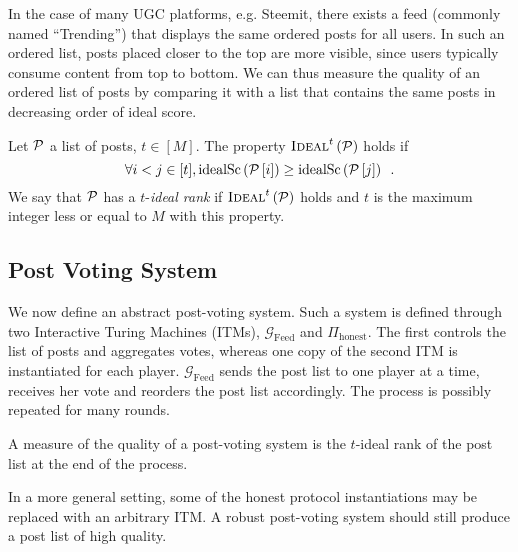 \documentclass[a4paper,english,cleveref, autoref]{oasics-v2019}
\begin{document}
    \noindent In the case of many UGC platforms, e.g. Steemit, there exists a
    feed (commonly named ``Trending'') that displays the same ordered posts for
    all users. In such an ordered list, posts placed closer to the top are more
    visible, since users typically consume content from top to bottom. We can
    thus measure the quality of an ordered list of posts by comparing it with a
    list that contains the same posts in decreasing order of ideal score.

\begin{definition}
  Let $\mathcal{P}$ a list of posts, $t \in [M]$. The property
  $\textsc{Ideal}^{t}\left(\mathcal{P}\right)$ holds if
  \begin{equation*}
    \forall i < j \in [t], \mathrm{idealSc}\left(\mathcal{P}\left[i\right]\right) \geq
    \mathrm{idealSc}\left(\mathcal{P}\left[j\right]\right) \enspace.
  \end{equation*}
  We say that $\mathcal{P}$ has a $t$-\emph{ideal rank} if
 $\textsc{Ideal}^{t}\left(\mathcal{P}\right)$ holds and $t$ is the maximum integer less or
  equal to $M$ with this property.
\end{definition}

  \subsection{Post Voting System}

    We now define an abstract post-voting system. Such a system is defined
    through two Interactive Turing Machines (ITMs),
    $\mathcal{G}_{\mathrm{Feed}}$ and $\Pi_{\mathrm{honest}}$. The first
    controls the list of posts and aggregates votes, whereas one copy of the
    second ITM is instantiated for each player. $\mathcal{G}_{\mathrm{Feed}}$
    sends the post list to one player at a time, receives her vote and reorders
    the post list accordingly. The process is possibly repeated for many rounds.

    A measure of the quality of a post-voting system is the $t$-ideal rank of
    the post list at the end of the process.

    In a more general setting, some of the honest protocol instantiations may be
    replaced with an arbitrary ITM. A robust post-voting system should still
    produce a post list of high quality.
\end{document}
